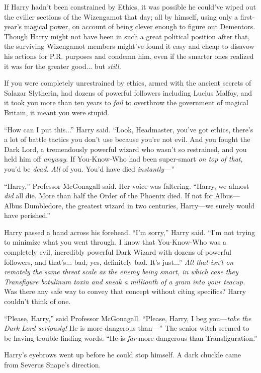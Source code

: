 If Harry hadn’t been constrained by Ethics, it was possible he could’ve wiped out the eviller sections of the Wizengamot that day; all by himself, using only a first-year’s magical power, on account of being clever enough to figure out Dementors. Though Harry might not have been in such a great political position after that, the surviving Wizengamot members might’ve found it easy and cheap to disavow his actions for P.R. purposes and condemn him, even if the smarter ones realized it was for the greater good... but \emph{still.}

If you were completely unrestrained by ethics, armed with the ancient secrets of Salazar Slytherin, had dozens of powerful followers including Lucius Malfoy, and it took you more than ten years to \emph{fail} to overthrow the government of magical Britain, it meant you were stupid.

“How can I put this...” Harry said. “Look, Headmaster, you’ve got ethics, there’s a lot of battle tactics you don’t use because you’re not evil. And you fought the Dark Lord, a tremendously powerful wizard who wasn’t so restrained, and you held him off \emph{anyway}. If You-Know-Who had been super-smart \emph{on top of that}, you’d be \emph{dead.} \emph{All} of you. You’d have died \emph{instantly—}”

“Harry,” Professor McGonagall said. Her voice was faltering. “Harry, we almost \emph{did} all die. More than half the Order of the Phoenix died. If not for Albus—Albus Dumbledore, the greatest wizard in two centuries, Harry—we surely would have perished.”

Harry passed a hand across his forehead. “I’m sorry,” Harry said. “I’m not trying to minimize what you went through. I know that You-Know-Who was a completely evil, incredibly powerful Dark Wizard with dozens of powerful followers, and that’s... bad, yes, definitely bad. It’s just...” \emph{All that isn’t on remotely the same threat scale as the enemy being smart, in which case they Transfigure botulinum toxin and sneak a millionth of a gram into your teacup.} Was there any safe way to convey that concept without citing specifics? Harry couldn’t think of one.

“Please, Harry,” said Professor McGonagall. “Please, Harry, I beg you—\emph{take the Dark Lord seriously!} He is more dangerous than—” The senior witch seemed to be having trouble finding words. “He is \emph{far} more dangerous than Transfiguration.”

Harry’s eyebrows went up before he could stop himself. A dark chuckle came from Severus Snape’s direction.

